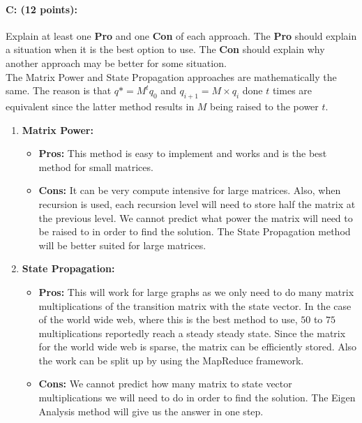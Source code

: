 \documentclass[11pt]{article}
\begin{document}
\paragraph{C: (12 points):} 
Explain at least one \textbf{Pro} and one \textbf{Con} of each approach. The \textbf{Pro} should explain a situation when it is the best option to use. The \textbf{Con} should explain why another approach may be better for some situation.\\

The Matrix Power and State Propagation approaches are mathematically the same. The reason is that $q* = M^tq_0$ and $q_{i+1} = M \times q_i$ done $t$ times are equivalent since the latter method results in $M$ being raised to the power $t$.

\begin{enumerate}

\item \textbf{Matrix Power:} 

\begin{itemize}

\item \textbf{Pros:} This method is easy to implement and works and is the best method for small matrices.

\item \textbf{Cons:} It can be very compute intensive for large matrices. Also, when recursion is used, each recursion level will need to store half the matrix at the previous level. We cannot predict what power the matrix will need to be raised to in order to find the solution. The State Propagation method will be better suited for large matrices.

\end{itemize}

\item \textbf{State Propagation:} 

\begin{itemize}

\item \textbf{Pros:} This will work for large graphs as we only need to do many matrix multiplications of the transition matrix with the state vector. In the case of the world wide web, where this is the best method to use, $50$ to $75$ multiplications reportedly reach a steady steady state. Since the matrix for the world wide web is sparse, the matrix can be efficiently stored. Also the work can be split up by using the MapReduce framework.

\item \textbf{Cons:} We cannot predict how many matrix to state vector multiplications we will need to do in order to find the solution. The Eigen Analysis method will give us the answer in one step.


\end{itemize}
\end{enumerate}
\end{document}
